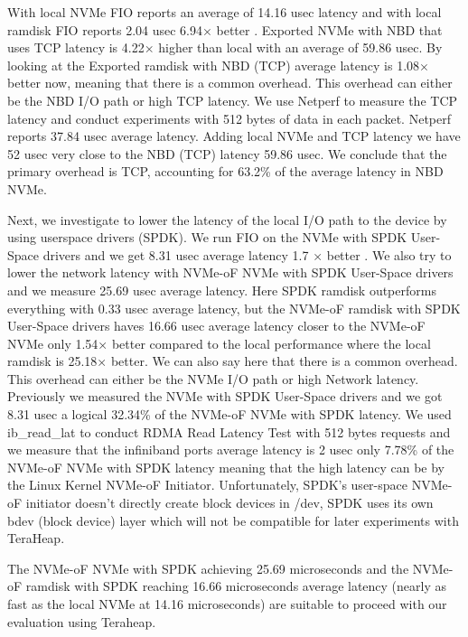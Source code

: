 {With local NVMe  FIO reports an average of 14.16 usec  latency and
with local ramdisk FIO reports 2.04 usec 6.94× better . Exported NVMe  with NBD that uses TCP
 latency is 4.22× higher
than local with an average of 59.86 usec. By
looking at the Exported ramdisk with NBD (TCP) average latency  is 1.08$\times$ better now, meaning that
there is a common overhead. This overhead can either be the NBD I/O path or high
TCP latency. We use Netperf to measure the TCP latency and conduct experiments
with 512 bytes of data in each packet. Netperf reports 37.84 usec average
latency. Adding local NVMe and TCP latency we have 52 usec very close to the NBD
(TCP) latency 59.86 usec. We conclude that the primary overhead is TCP,
accounting for 63.2\% of the average latency in NBD NVMe.

Next, we investigate to lower the latency of the local I/O path to the device by
using userspace drivers (SPDK). We run FIO on the NVMe with SPDK User-Space
drivers and we get 8.31 usec average latency 1.7 × better . We also try to lower
the network latency with NVMe-oF NVMe with SPDK User-Space drivers and we
measure 25.69 usec average latency. Here SPDK ramdisk outperforms everything
with 0.33 usec average latency, but the NVMe-oF ramdisk with SPDK User-Space
drivers haves 16.66 usec average latency closer to the NVMe-oF NVMe only 1.54×
better compared to the local performance where the local ramdisk is 25.18×
better. We can also say here that there is a common overhead. This overhead can
either be the NVMe I/O path or high Network latency. Previously we measured the
NVMe with SPDK User-Space drivers and we got 8.31 usec a logical 32.34\% of the
NVMe-oF NVMe with SPDK latency. We used ib\_read\_lat to conduct RDMA Read
Latency Test with 512 bytes requests and we measure that the infiniband ports
average latency is 2 usec only 7.78\% of the NVMe-oF NVMe with SPDK latency
meaning that the high latency can be by the Linux Kernel NVMe-oF Initiator.
Unfortunately, SPDK's user-space NVMe-oF initiator doesn't directly create block
devices in /dev, SPDK uses its own bdev (block device) layer which will not be
compatible for later experiments with TeraHeap. 

The NVMe-oF NVMe with SPDK achieving 25.69 microseconds and the NVMe-oF ramdisk
with SPDK reaching 16.66 microseconds average latency (nearly as fast as the
local NVMe at 14.16 microseconds) are suitable to proceed with our evaluation
using Teraheap.

}
